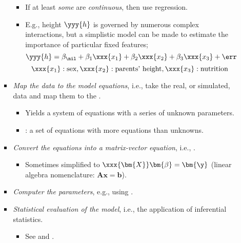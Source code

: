 \begin{itemize}
\begin{itemize}
\begin{itemize}
\begin{itemize}
          \item If at least \emph{some}  are \emph{continuous}, then use regression.
          \item E.g., height \(\yyy{h}\) is governed by numerous complex interactions, but a simplistic model can be made to estimate the importance of particular fixed features;
          \[%
          \yyy{h} = \beta_\nil + \beta_1 \xxx{x_1} + \beta_2 \xxx{x_2} + \beta_3  \xxx{x_3} + \err
          \]%
          \[%
          \xxx{x_1}: \text{sex},\xxx{x_2}: \text{parents' height}, \xxx{x_3}: \text{nutrition}
          \]%
        \end{itemize}
      \item \emph{Map the data to the model equations}, i.e.,  take the real, or simulated, data and map them to the .
        \begin{itemize}
          \item Yields a system of equations with a series of unknown parameters. 
          \item {}: a set of equations with more equations than unknowns.
        \end{itemize}
      \item \emph{Convert the equations into a matrix-vector equation}, i.e., \hyperref[Section: Regression Models]{}.
        \begin{itemize}
          \item Sometimes simplified to \(\xxx{\bm{X}}\bm{\beta} = \bm{\y}\) (linear algebra nomenclature: \(\bm{Ax}=\bm{b}\)).
        \end{itemize}
      \item \emph{Computer the parameters}, e.g., using \hyperref[Subsection: Least-Squares]{}.
      \item \emph{Statistical evaluation of the model}, i.e., the application of inferential statistics.
        \begin{itemize}
          \item See \hyperref[Subsection: Model Significance]{} and \hyperref[Subsection: Standardized Regression Coefficients]{}.
        \end{itemize}
    \end{itemize}
  \end{itemize}


\end{itemize}
